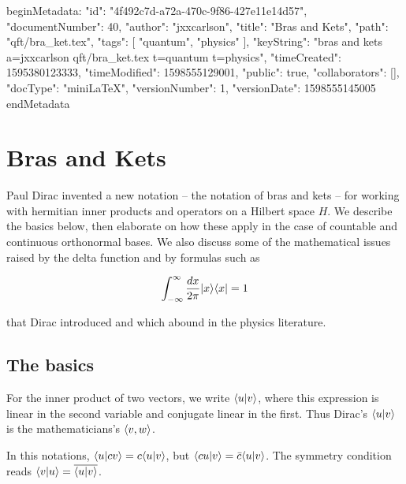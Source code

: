 beginMetadata:
{
    "id": "4f492c7d-a72a-470c-9f86-427e11e14d57",
    "documentNumber": 40,
    "author": "jxxcarlson",
    "title": "Bras and Kets",
    "path": "qft/bra_ket.tex",
    "tags": [
        "quantum",
        "physics"
    ],
    "keyString": "bras and kets a=jxxcarlson qft/bra_ket.tex t=quantum t=physics",
    "timeCreated": 1595380123333,
    "timeModified": 1598555129001,
    "public": true,
    "collaborators": [],
    "docType": "miniLaTeX",
    "versionNumber": 1,
    "versionDate": 1598555145005
}
endMetadata
\begin{mathmacro}
\newcommand{\bra}[0]{\langle}
\newcommand{\ket}[0]{\rangle}
\newcommand{\id}[0]{\ Id\ }
\newcommand{\set}[1]{\{#1\}}
\end{mathmacro}

\setcounter{section}{8}

\section{Bras and Kets}


Paul Dirac invented a new notation -- the notation of bras and kets -- for working with hermitian inner products and operators on a Hilbert space $H$.  We describe the basics below, then elaborate on how these apply in the case of countable and continuous orthonormal bases.  We also discuss some of the mathematical issues raised by the delta function and by formulas such as

\begin{equation}
\int_{-\infty}^\infty \frac{dx}{2\pi} | x \ket\bra x | = 1
\end{equation}

that Dirac introduced and which abound in the physics literature.

\subsection{The basics}

For the inner product of two vectors, we write $\bra u | v \ket$, where this expression is linear in the second variable and conjugate linear in the first.  Thus Dirac's $\bra u | v \ket$ is the mathematicians's $\bra v, w \ket$.  

In this notations, $\bra u | c v\ket = c\bra u | v \ket$, but $\bra cu |  v\ket = \bar c\bra u | v \ket$. The symmetry condition reads $\bra v | u \ket = \overline{\langle u  | v \rangle}$.  

